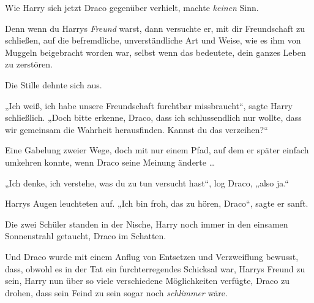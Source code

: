 Wie Harry sich jetzt Draco gegenüber verhielt, machte \emph{keinen} Sinn.

Denn wenn du Harrys \emph{Freund} warst, dann versuchte er, mit dir Freundschaft zu schließen, auf die befremdliche, unverständliche Art und Weise, wie es ihm von Muggeln beigebracht worden war, selbst wenn das bedeutete, dein ganzes Leben zu zerstören.

Die Stille dehnte sich aus.

„Ich weiß, ich habe unsere Freundschaft furchtbar missbraucht“, sagte Harry schließlich.
„Doch bitte erkenne, Draco, dass ich schlussendlich nur wollte, dass wir gemeinsam die Wahrheit herausfinden. Kannst du das verzeihen?“

Eine Gabelung zweier Wege, doch mit nur einem Pfad, auf dem er später einfach umkehren konnte, wenn Draco seine Meinung änderte …

„Ich denke, ich verstehe, was du zu tun versucht hast“, log Draco, „also ja.“

Harrys Augen leuchteten auf.
„Ich bin froh, das zu hören, Draco“, sagte er sanft.

Die zwei Schüler standen in der Nische, Harry noch immer in den einsamen Sonnenstrahl getaucht, Draco im Schatten.

Und Draco wurde mit einem Anflug von Entsetzen und Verzweiflung bewusst, dass, obwohl es in der Tat ein furchterregendes Schicksal war, Harrys Freund zu sein, Harry nun über so viele verschiedene Möglichkeiten verfügte, Draco zu drohen, dass sein Feind zu sein sogar noch \emph{schlimmer} wäre.

